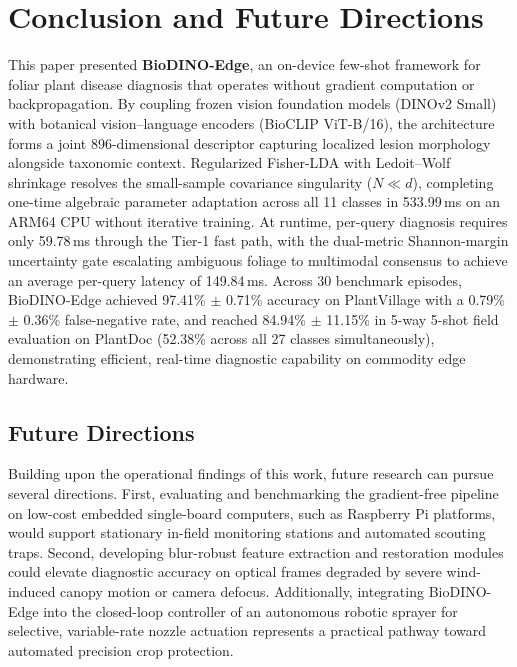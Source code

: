 \section{Conclusion and Future Directions}
\label{sec:conclusion}

This paper presented \textbf{BioDINO-Edge}, an on-device few-shot framework for foliar plant disease diagnosis that operates without gradient computation or backpropagation. By coupling frozen vision foundation models (DINOv2 Small) with botanical vision--language encoders (BioCLIP ViT-B/16), the architecture forms a joint 896-dimensional descriptor capturing localized lesion morphology alongside taxonomic context. Regularized Fisher-LDA with Ledoit--Wolf shrinkage resolves the small-sample covariance singularity ($N \ll d$), completing one-time algebraic parameter adaptation across all 11 classes in 533.99\,ms on an ARM64 CPU without iterative training. At runtime, per-query diagnosis requires only 59.78\,ms through the Tier-1 fast path, with the dual-metric Shannon-margin uncertainty gate escalating ambiguous foliage to multimodal consensus to achieve an average per-query latency of 149.84\,ms. Across 30 benchmark episodes, BioDINO-Edge achieved 97.41\% $\pm$ 0.71\% accuracy on PlantVillage with a 0.79\% $\pm$ 0.36\% false-negative rate, and reached 84.94\% $\pm$ 11.15\% in 5-way 5-shot field evaluation on PlantDoc (52.38\% across all 27 classes simultaneously), demonstrating efficient, real-time diagnostic capability on commodity edge hardware.

\subsection{Future Directions}
Building upon the operational findings of this work, future research can pursue several directions. First, evaluating and benchmarking the gradient-free pipeline on low-cost embedded single-board computers, such as Raspberry Pi platforms, would support stationary in-field monitoring stations and automated scouting traps. Second, developing blur-robust feature extraction and restoration modules could elevate diagnostic accuracy on optical frames degraded by severe wind-induced canopy motion or camera defocus. Additionally, integrating BioDINO-Edge into the closed-loop controller of an autonomous robotic sprayer for selective, variable-rate nozzle actuation represents a practical pathway toward automated precision crop protection.
